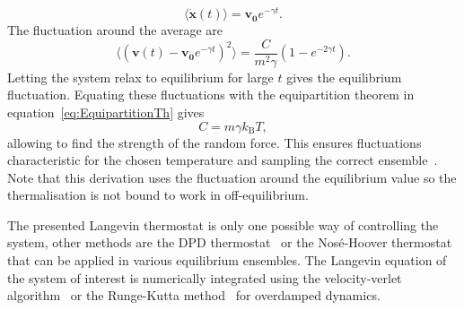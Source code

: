 \begin{equation}
 \langle \mathbf{ \dot x} (t) \rangle = \mathbf{ v_0} e^{-\gamma t}.
\end{equation}
The fluctuation around the average are
\begin{equation}
 \langle (\mathbf{v}(t) - \mathbf{v_0} e^{-\gamma t})^2\rangle = \frac{C}{m^2\gamma} (1-e^{-2\gamma t}).
\end{equation}
Letting the system relax to equilibrium for large $t$ gives the equilibrium fluctuation. Equating these fluctuations with the equipartition theorem in equation~\ref{eq:EquipartitionTh} gives
\begin{equation}
 C = m\gamma k_{\mathrm{B}} T,
\end{equation}
allowing to find the strength of the random force. This ensures fluctuations characteristic for the chosen temperature and sampling the correct ensemble~\cite{pomeau2017langevin}. Note that this derivation uses the fluctuation around the equilibrium value so the thermalisation is not bound to work in off-equilibrium. 

The presented Langevin thermostat is only one possible way of controlling the system, other methods are the DPD thermostat~\cite{soddemann2003dissipative} or the Nos\'{e}-Hoover thermostat~\cite{hoover1985canonical} that can be applied in various equilibrium ensembles. The Langevin equation of the system of interest is numerically integrated using the velocity-verlet algorithm~\cite{verlet1967computer} or the Runge-Kutta method~\cite{kutta1901beitrag} for overdamped dynamics. 


